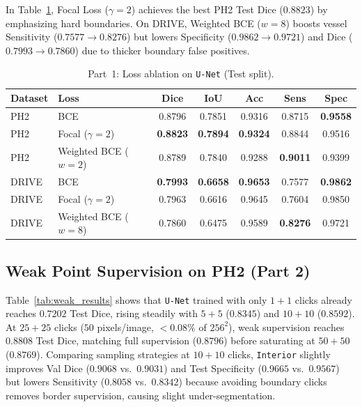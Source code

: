 In Table~\ref{tab:loss_ablation}, Focal Loss ($\gamma=2$) achieves the best PH2 Test Dice ($0.8823$) by emphasizing hard boundaries. On DRIVE, Weighted BCE ($w=8$) boosts vessel Sensitivity ($0.7577 \to 0.8276$) but lowers Specificity ($0.9862 \to 0.9721$) and Dice ($0.7993 \to 0.7860$) due to thicker boundary false positives.

\begin{table}[t]
\centering
\caption{Part~1: Loss ablation on \texttt{U-Net} (Test split).}
\label{tab:loss_ablation}
\scriptsize
\begin{tabular}{@{}llccccc@{}}
\toprule
Dataset & Loss & Dice & IoU & Acc & Sens & Spec \\
\midrule
PH2 & BCE                 & 0.8796 & 0.7851 & 0.9316 & 0.8715 & \textbf{0.9558} \\
PH2 & Focal ($\gamma=2$)  & \textbf{0.8823} & \textbf{0.7894} & \textbf{0.9324} & 0.8844 & 0.9516 \\
PH2 & Weighted BCE ($w=2$)& 0.8789 & 0.7840 & 0.9288 & \textbf{0.9011} & 0.9399 \\
\midrule
DRIVE & BCE                 & \textbf{0.7993} & \textbf{0.6658} & \textbf{0.9653} & 0.7577 & \textbf{0.9862} \\
DRIVE & Focal ($\gamma=2$)  & 0.7963 & 0.6616 & 0.9645 & 0.7604 & 0.9850 \\
DRIVE & Weighted BCE ($w=8$)& 0.7860 & 0.6475 & 0.9589 & \textbf{0.8276} & 0.9721 \\
\bottomrule
\end{tabular}
\end{table}

\subsection{Weak Point Supervision on PH2 (Part 2)}
Table~\ref{tab:weak_results} shows that \texttt{U-Net} trained with only $1+1$ clicks already reaches $0.7202$ Test Dice, rising steadily with $5+5$ ($0.8345$) and $10+10$ ($0.8592$). At $25+25$ clicks ($50$ pixels/image, $<0.08\%$ of $256^2$), weak supervision reaches $0.8808$ Test Dice, matching full supervision ($0.8796$) before saturating at $50+50$ ($0.8769$). Comparing sampling strategies at $10+10$ clicks, \texttt{Interior} slightly improves Val Dice ($0.9068$ vs.\ $0.9031$) and Test Specificity ($0.9665$ vs.\ $0.9567$) but lowers Sensitivity ($0.8058$ vs.\ $0.8342$) because avoiding boundary clicks removes border supervision, causing slight under-segmentation.


